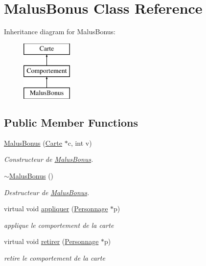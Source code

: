 \hypertarget{class_malus_bonus}{\section{Malus\-Bonus Class Reference}
\label{class_malus_bonus}
}
Inheritance diagram for Malus\-Bonus\-:\begin{figure}[H]
\begin{center}
\leavevmode
\includegraphics[height=3.000000cm]{class_malus_bonus}
\end{center}
\end{figure}
\subsection*{Public Member Functions}
\begin{DoxyCompactItemize}
\item 
\hyperlink{class_malus_bonus_a730f17b06282de4d63ba3cd078cce92f}{Malus\-Bonus} (\hyperlink{class_carte}{Carte} $\ast$c, int v)
\begin{DoxyCompactList}\small\item\em Constructeur de \hyperlink{class_malus_bonus}{Malus\-Bonus}. \end{DoxyCompactList}\item 
\hypertarget{class_malus_bonus_a83acf04a0977f8e4703d675bd1d68c56}{\hyperlink{class_malus_bonus_a83acf04a0977f8e4703d675bd1d68c56}{$\sim$\-Malus\-Bonus} ()}\label{class_malus_bonus_a83acf04a0977f8e4703d675bd1d68c56}

\begin{DoxyCompactList}\small\item\em Destructeur de \hyperlink{class_malus_bonus}{Malus\-Bonus}. \end{DoxyCompactList}\item 
virtual void \hyperlink{class_malus_bonus_aede2c45aa2a0d0f751c128e05d26fb6a}{appliquer} (\hyperlink{class_personnage}{Personnage} $\ast$p)
\begin{DoxyCompactList}\small\item\em applique le comportement de la carte \end{DoxyCompactList}\item 
virtual void \hyperlink{class_malus_bonus_a213a8e9301ac84e2cf338476bf6613fc}{retirer} (\hyperlink{class_personnage}{Personnage} $\ast$p)
\begin{DoxyCompactList}\small\item\em retire le comportement de la carte \end{DoxyCompactList}\end{DoxyCompactItemize}
